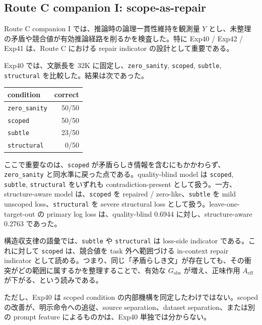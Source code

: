 \documentclass[12pt,a4paper]{article}
\begin{document}
\subsection{Route C companion I: scope-as-repair}\label{route-c-companion-i-scope-as-repair}

Route C companion I では、推論時の論理一貫性維持を観測量 \(Y\) とし、未整理の矛盾や競合値が有効推論経路を削るかを検査した。特に Exp40 / Exp42 / Exp41 は、Route C における repair indicator の設計として重要である。

Exp40 では、文脈長を 32K に固定し、\texttt{zero\_sanity}, \texttt{scoped}, \texttt{subtle}, \texttt{structural} を比較した。結果は次であった。

{\def\LTcaptype{table} %
\begin{longtable}[]{@{}lr@{}}
\toprule\noalign{}
condition & correct \\
\midrule\noalign{}
\endhead
\bottomrule\noalign{}
\endlastfoot
\texttt{zero\_sanity} & 50/50 \\
\texttt{scoped} & 50/50 \\
\texttt{subtle} & 23/50 \\
\texttt{structural} & 0/50 \\
\end{longtable}
}

ここで重要なのは、\texttt{scoped} が矛盾らしき情報を含むにもかかわらず、\texttt{zero\_sanity} と同水準に戻った点である。quality-blind model は \texttt{scoped}, \texttt{subtle}, \texttt{structural} をいずれも contradiction-present として扱う。一方、structure-aware model は、\texttt{scoped} を repaired / zero-like、\texttt{subtle} を mild unscoped loss、\texttt{structural} を severe structural loss として扱う。leave-one-target-out の primary log loss は、quality-blind 0.6944 に対し、structure-aware 0.2763 であった。

構造収支律の語彙では、\texttt{subtle} や \texttt{structural} は loss-side indicator である。これに対して \texttt{scoped} は、競合値を task 外へ範囲づける in-context repair indicator として読める。つまり、同じ「矛盾らしき文」が存在しても、その衝突がどの範囲に属するかを整理することで、有効な \(G_{\mathrm{obs}}\) が増え、正味作用 \(A_{\mathrm{eff}}\) が下がる、という読みである。

ただし、Exp40 は scoped condition の内部機構を同定したわけではない。scoped の改善が、明示命令への追従、source separation、dataset separation、または別の prompt feature によるものかは、Exp40 単独では分からない。
\end{document}

